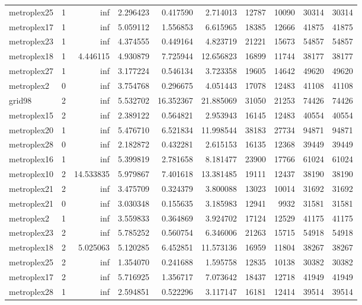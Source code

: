 \begin{longtable}{|l|r|r|r|r|r|r|r|r|r|}
metroplex25 & 1 & inf & 2.296423 & 0.417590 & 2.714013 & 12787 & 10090 & 30314 & 30314 \\
metroplex17 & 1 & inf & 5.059112 & 1.556853 & 6.615965 & 18385 & 12666 & 41875 & 41875 \\
metroplex23 & 1 & inf & 4.374555 & 0.449164 & 4.823719 & 21221 & 15673 & 54857 & 54857 \\
metroplex18 & 1 & 4.446115 & 4.930879 & 7.725944 & 12.656823 & 16899 & 11744 & 38177 & 38177 \\
metroplex27 & 1 & inf & 3.177224 & 0.546134 & 3.723358 & 19605 & 14642 & 49620 & 49620 \\
metroplex2 & 0 & inf & 3.754768 & 0.296675 & 4.051443 & 17078 & 12483 & 41108 & 41108 \\
grid98 & 2 & inf & 5.532702 & 16.352367 & 21.885069 & 31050 & 21253 & 74426 & 74426 \\
metroplex15 & 2 & inf & 2.389122 & 0.564821 & 2.953943 & 16145 & 12483 & 40554 & 40554 \\
metroplex20 & 1 & inf & 5.476710 & 6.521834 & 11.998544 & 38183 & 27734 & 94871 & 94871 \\
metroplex28 & 0 & inf & 2.182872 & 0.432281 & 2.615153 & 16135 & 12368 & 39449 & 39449 \\
metroplex16 & 1 & inf & 5.399819 & 2.781658 & 8.181477 & 23900 & 17766 & 61024 & 61024 \\
metroplex10 & 2 & 14.533835 & 5.979867 & 7.401618 & 13.381485 & 19111 & 12437 & 38190 & 38190 \\
metroplex21 & 2 & inf & 3.475709 & 0.324379 & 3.800088 & 13023 & 10014 & 31692 & 31692 \\
metroplex21 & 0 & inf & 3.030348 & 0.155635 & 3.185983 & 12941 & 9932 & 31581 & 31581 \\
metroplex2 & 1 & inf & 3.559833 & 0.364869 & 3.924702 & 17124 & 12529 & 41175 & 41175 \\
metroplex23 & 2 & inf & 5.785252 & 0.560754 & 6.346006 & 21263 & 15715 & 54918 & 54918 \\
metroplex18 & 2 & 5.025063 & 5.120285 & 6.452851 & 11.573136 & 16959 & 11804 & 38267 & 38267 \\
metroplex25 & 2 & inf & 1.354070 & 0.241688 & 1.595758 & 12835 & 10138 & 30382 & 30382 \\
metroplex17 & 2 & inf & 5.716925 & 1.356717 & 7.073642 & 18437 & 12718 & 41949 & 41949 \\
metroplex28 & 1 & inf & 2.594851 & 0.522296 & 3.117147 & 16181 & 12414 & 39514 & 39514 \\

\end{longtable}
